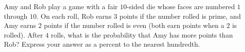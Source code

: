 Amy and Rob play a game with a fair $10$-sided die whose faces are numbered $1$ through $10$. On each roll, Rob earns $3$ points if the number rolled is prime, and Amy earns $2$ points if the number rolled is even (both earn points when a $2$ is rolled). After $4$ rolls, what is the probability that Amy has more points than Rob? Express your answer as a percent to the nearest hundredth.
